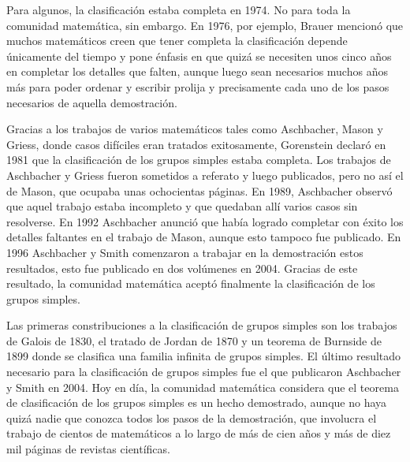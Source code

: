 Para algunos, la clasificación estaba completa en 1974. No para toda la
comunidad matemática, sin embargo. En 1976, por ejemplo, Brauer mencionó que
muchos matemáticos creen que tener completa la clasificación depende únicamente
del tiempo y pone énfasis en
que quizá se necesiten unos cinco años en completar los detalles que falten,
aunque luego sean necesarios muchos años más para poder ordenar y escribir
prolija y precisamente cada uno de los pasos necesarios de aquella demostración. 

Gracias a los trabajos de varios matemáticos tales como Aschbacher, Mason y
Griess, donde casos difíciles eran tratados exitosamente, Gorenstein declaró en
1981 que la clasificación de los grupos simples estaba completa. Los trabajos
de Aschbacher y Griess fueron sometidos a referato y luego publicados, pero no
así el de Mason, que ocupaba unas ochocientas páginas.  En 1989, Aschbacher
observó que aquel trabajo estaba incompleto y que quedaban allí varios casos
sin resolverse. En 1992 Aschbacher anunció que había logrado completar con
éxito los detalles faltantes en el trabajo de Mason, aunque esto tampoco fue
publicado. En 1996 Aschbacher y Smith comenzaron a trabajar en la demostración 
estos resultados, esto fue publicado en dos volúmenes en 2004. Gracias
de este resultado, la comunidad matemática aceptó finalmente la clasificación de los
grupos simples. 




Las primeras constribuciones a la clasificación de grupos simples son los
trabajos de Galois de 1830, el tratado de Jordan de 1870 y un teorema de
Burnside de 1899 donde se clasifica una familia infinita de grupos simples. El
último resultado necesario para la clasificación de grupos simples fue
el que publicaron Aschbacher y Smith en 2004. Hoy en día, la
comunidad matemática considera que el teorema de clasificación de los grupos
simples es un hecho demostrado, aunque no haya quizá nadie que conozca todos
los pasos de la demostración, que involucra el trabajo de cientos de
matemáticos a lo largo de más de cien años y más de diez mil páginas de
revistas científicas. 


